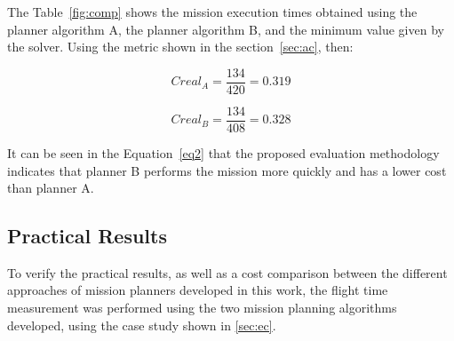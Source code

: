 \documentclass[conference,harvard,brazil,english]{sbatex}
\begin{document}
The Table~\ref{fig:comp} shows the mission execution times obtained using the planner algorithm A, the planner algorithm B, and the minimum value given by the solver. Using the metric shown in the section~\ref{sec:ac}, then:

\begin{equation}
Creal_A=\frac{134}{420}=0.319
\label{eq1}
\end{equation}

\begin{equation}
Creal_B=\frac{134}{408}=0.328
\label{eq2}
\end{equation}

It can be seen in the Equation~\ref{eq2} that the proposed evaluation methodology indicates that planner B performs the mission more quickly and has a lower cost than planner A.

\subsection{Practical Results}

To verify the practical results, as well as a cost comparison between the different approaches of mission planners developed in this work, the flight time measurement was performed using the two mission planning algorithms developed, using the case study shown in \ref{sec:ec}.
%


\end{document}
